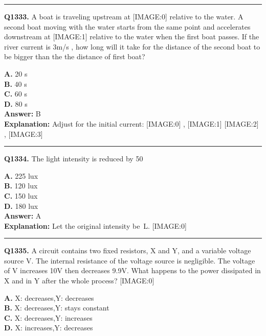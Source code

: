 \documentclass[12pt]{article}
\begin{document}
\hrule
\vspace{1em}


\noindent
\textbf{Q1333.} A boat is traveling upstream at
[IMAGE:0]
relative to the water. A second boat moving with the water starts from the same point and accelerates downstream at
[IMAGE:1]
relative to the water when the first boat passes. If the river current is 3m/s
, how long will it take for the distance of the second boat to be bigger than the the distance of first boat?



\textbf{A.} 20 s \\
\textbf{B.} 40 s \\
\textbf{C.} 60 s \\
\textbf{D.} 80 s \\

\textbf{Answer:} B \\
\textbf{Explanation:} Adjust for the initial current:
[IMAGE:0]
,
[IMAGE:1]
[IMAGE:2]
,
[IMAGE:3]

\hrule
\vspace{1em}


\noindent
\textbf{Q1334.} The light intensity is reduced by 50%



\textbf{A.} 225 lux \\
\textbf{B.} 120 lux \\
\textbf{C.} 150 lux \\
\textbf{D.} 180 lux \\

\textbf{Answer:} A \\
\textbf{Explanation:} Let the original intensity be L.
[IMAGE:0]

\hrule
\vspace{1em}


\noindent
\textbf{Q1335.} A circuit contains two fixed resistors, X and Y, and a variable voltage source V. The internal resistance of the voltage source is negligible.
The voltage of V increases 10V then decreases 9.9V. What happens to the power dissipated in X and in Y after the whole process?
[IMAGE:0]



\textbf{A.} X: decreases,Y: decreases \\
\textbf{B.} X: decreases,Y: stays constant \\
\textbf{C.} X: decreases,Y: increases \\
\textbf{D.} X: increases,Y: decreases \\
\end{document}
